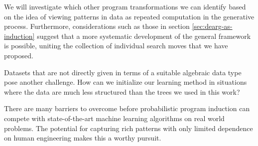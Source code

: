 \documentclass[a4paper,10pt]{article}
\begin{document}
We will investigate which other program transformations we can identify based on the idea of viewing patterns in data as repeated computation in the generative process. Furthermore, considerations such as those in section \ref{sec:dearg-as-induction} suggest that a more systematic development of the general framework is possible, uniting the collection of individual search moves that we have proposed.

Datasets that are not directly given in terms of a suitable algebraic data type pose another challenge. How can we initialize our learning method in situations where the data are much less structured than the trees we used in this work?

There are many barriers to overcome before probabilistic program induction can compete with state-of-the-art machine learning algorithms on real world problems. The potential for capturing rich patterns with only limited dependence on human engineering makes this a worthy pursuit.

\newpage


\end{document}
